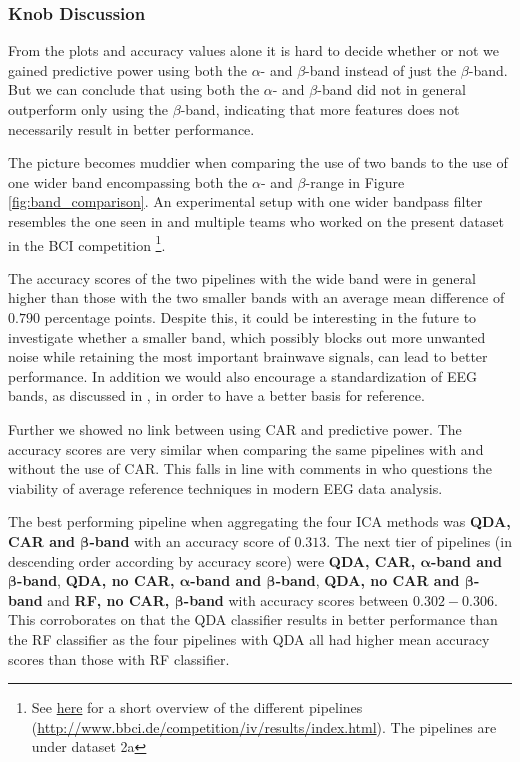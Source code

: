 	\subsubsection{Knob Discussion} From the plots and accuracy values alone it is hard to decide whether or not we gained predictive power using both the $\alpha$- and $\beta$-band instead of just the $\beta$-band. But we can conclude that using both the $\alpha$- and $\beta$-band did not in general outperform only using the $\beta$-band, indicating that more features does not necessarily result in better performance.

	The picture becomes muddier when comparing the use of two bands to the use of one wider band encompassing both the $\alpha$- and $\beta$-range in Figure \ref{fig:band_comparison}. An experimental setup with one wider bandpass filter resembles the one seen in \cite{pfister2019} and multiple teams who worked on the present dataset in the BCI competition \cite{BCIdataset2008} \footnote{See \href{http://www.bbci.de/competition/iv/results/index.html}{here} for a short overview of the different pipelines (\url{http://www.bbci.de/competition/iv/results/index.html}). The pipelines are under dataset 2a}. 

	The accuracy scores of the two pipelines with the wide band were in general higher than those with the two smaller bands with an average mean difference of $0.790$ percentage points. Despite this, it could be interesting in the future to investigate whether a smaller band, which possibly blocks out more unwanted noise while retaining the most important brainwave signals, can lead to better performance. In addition we would also encourage a standardization of EEG bands, as discussed in \cite{newson2019}, in order to have a better basis for reference.

	Further we showed no link between using CAR and predictive power. The accuracy scores are very similar when comparing the same pipelines with and without the use of CAR. This falls in line with comments in \cite{yao2019} who questions the viability of average reference techniques in modern EEG data analysis. 

	The best performing pipeline when aggregating the four ICA methods was \textbf{QDA, CAR and $\bm\beta$-band} with an accuracy score of $0.313$. The next tier of pipelines (in descending order according by accuracy score) were \textbf{QDA, CAR, $\bm\alpha$-band and $\bm\beta$-band}, \textbf{QDA, no CAR, $\bm\alpha$-band and $\bm\beta$-band}, \textbf{QDA, no CAR and $\bm\beta$-band} and \textbf{RF, no CAR, $\bm\beta$-band} with accuracy scores between $0.302-0.306$. This corroborates on that the QDA classifier results in better performance than the RF classifier as the four pipelines with QDA all had higher mean accuracy scores than those with RF classifier.

